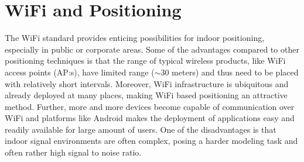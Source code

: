 \documentclass{LTHthesis}
\begin{document}
\section{WiFi and Positioning}
%
The WiFi standard provides enticing possibilities for indoor positioning, especially in public or corporate areas. Some of the advantages compared to other positioning techniques is that the range of typical wireless products, like WiFi access points (AP:s), have limited range ($\sim 30$ meters) and thus need to be placed with relatively short intervals. Moreover, WiFi infrastructure is ubiquitous and already deployed at many places, making WiFi based positioning an attractive method. Further, more and more devices become capable of communication over WiFi and platforms like Android makes the deployment of applications easy and readily available for large amount of users. One of the disadvantages is that indoor signal environments are often complex, posing a harder modeling task and often rather high signal to noise ratio.
\end{document}
